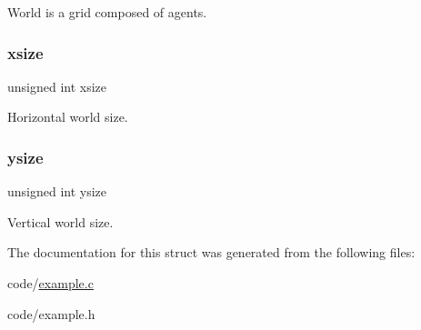 World is a grid composed of agents. \mbox{\label{struct_w_o_r_l_d_aa4b0263c533c5ce471067bd5ede24477}} 
\subsubsection{\texorpdfstring{xsize}{xsize}}
{\footnotesize\ttfamily unsigned int xsize}

Horizontal world size. \mbox{\label{struct_w_o_r_l_d_a7e7fdb6b4d76fd619024da6878c27d58}} 
\subsubsection{\texorpdfstring{ysize}{ysize}}
{\footnotesize\ttfamily unsigned int ysize}

Vertical world size. 

The documentation for this struct was generated from the following files\+:\begin{DoxyCompactItemize}
\item 
code/\mbox{\hyperlink{example_8c}{example.\+c}}\item 
code/example.\+h\end{DoxyCompactItemize}
